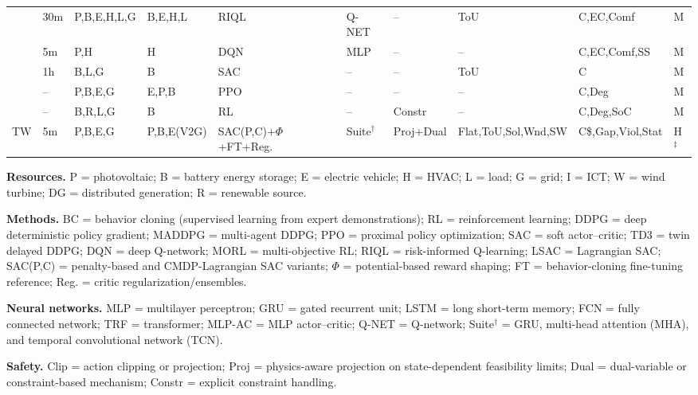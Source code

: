 \documentclass[preprint,12pt, 3p]{elsarticle}
\begin{document}
\begin{table}[t]
{\begin{tabular}{@{}llllllllll@{}}
\cite{xiong2026offline-67f}
& 30m & P,B,E,H,L,G & B,E,H,L & RIQL & Q-NET & -- & ToU & C,EC,Comf & M \\

\cite{lissa2021deep-fe8}
& 5m & P,H & H & DQN & MLP & -- & -- & C,EC,Comf,SS & M \\

\cite{XIONG20243501}
& 1h & B,L,G & B & SAC & -- & -- & ToU & C & M \\

\cite{en16155689}
& -- & P,B,E,G & E,P,B & PPO & -- & -- & -- & C,Deg & M \\

\cite{10142173}
& -- & B,R,L,G & B & RL & -- & Constr & -- & C,Deg,SoC & M \\

TW
& 5m & P,B,E,G & P,B,E(V2G) & SAC(P,C)+$\Phi$+FT+Reg. & Suite$^\dagger$ & Proj+Dual & Flat,ToU,Sol,Wnd,SW & C\$,Gap,Viol,Stat & H$^{\ddagger}$ \\

\bottomrule
\end{tabular}%
}

\vspace{2pt}
\begin{minipage}{0.98\textwidth}
\scriptsize
\textbf{Resources.} P = photovoltaic; B = battery energy storage; E = electric vehicle; H = HVAC; L = load; G = grid; I = ICT; W = wind turbine; DG = distributed generation; R = renewable source.

\textbf{Methods.} BC = behavior cloning (supervised learning from expert demonstrations); RL = reinforcement learning; DDPG = deep deterministic policy gradient; MADDPG = multi-agent DDPG; PPO = proximal policy optimization; SAC = soft actor--critic; TD3 = twin delayed DDPG; DQN = deep Q-network; MORL = multi-objective RL; RIQL = risk-informed Q-learning; LSAC = Lagrangian SAC; SAC(P,C) = penalty-based and CMDP-Lagrangian SAC variants; $\Phi$ = potential-based reward shaping; FT = behavior-cloning fine-tuning reference; Reg. = critic regularization/ensembles.

\textbf{Neural networks.} MLP = multilayer perceptron; GRU = gated recurrent unit; LSTM = long short-term memory; FCN = fully connected network; TRF = transformer; MLP-AC = MLP actor--critic; Q-NET = Q-network; Suite$^\dagger$ = GRU, multi-head attention (MHA), and temporal convolutional network (TCN).

\textbf{Safety.} Clip = action clipping or projection; Proj = physics-aware projection on state-dependent feasibility limits; Dual = dual-variable or constraint-based mechanism; Constr = explicit constraint handling.


\end{minipage}
\end{table}
\end{document}
